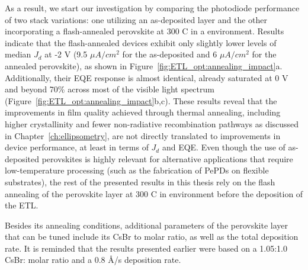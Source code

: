 As a result, we start our investigation by comparing the photodiode performance of two stack variations: one utilizing an as-deposited  layer and the other incorporating a flash-annealed perovskite at 300 \degree C in a  environment. Results indicate that the flash-annealed devices exhibit only slightly lower levels of median $J_d$ at -2 V (9.5 $\mu A/cm^2$ for the as-deposited and 6 $\mu A/cm^2$ for the annealed perovskite), as shown in Figure~\ref{fig:ETL_opt:annealing_impact}a. Additionally, their EQE response is almost identical, already saturated at 0 V and beyond 70\% across most of the visible light spectrum (Figure~\ref{fig:ETL_opt:annealing_impact}b,c). These results reveal that the improvements in film quality achieved through thermal annealing, including higher crystallinity and fewer non-radiative recombination pathways as discussed in Chapter~\ref{ch:ellipsometry}, are not directly translated to improvements in device performance, at least in terms of $J_d$ and EQE. Even though the use of as-deposited perovskites is highly relevant for alternative applications that require low-temperature processing (such as the fabrication of PePDs on flexible substrates), the rest of the presented results in this thesis rely on the flash annealing of the perovskite layer at 300 \degree C in  environment before the deposition of the ETL. 


Besides its annealing conditions, additional parameters of the perovskite layer that can be tuned include its CsBr to  molar ratio, as well as the total deposition rate. It is reminded that the results presented earlier were based on a 1.05:1.0 CsBr: molar ratio and a 0.8 \AA/s deposition rate. 


